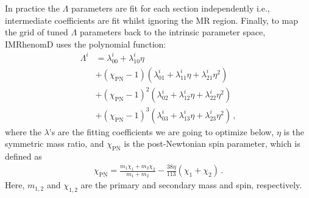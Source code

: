 \documentclass[twocolumn]{aastex631}
\begin{document}
In practice the $\Lambda$ parameters are fit for each section independently i.e., intermediate coefficients are fit whilst ignoring the MR region.
Finally, to map the grid of tuned $\Lambda$ parameters back to the intrinsic parameter space, IMRhenomD uses the polynomial function:
\begin{align} \label{eq:Lambda}
	\Lambda^i&=\lambda_{00}^i+\lambda_{10}^i\eta \nonumber \\
	&+(\chi_{\mathrm{PN}}-1)(\lambda_{01}^i+\lambda_{11}^i\eta+\lambda_{21}^i\eta^2) \nonumber \\ 
	&+(\chi_{\mathrm{PN}}-1)^2(\lambda_{02}^i+\lambda_{12}^i\eta+\lambda_{22}^i\eta^2) \nonumber \\
	&+(\chi_{\mathrm{PN}}-1)^3(\lambda_{03}^i+\lambda_{13}^i\eta+\lambda_{23}^i\eta^2)\,,
\end{align}
where the $\lambda$'s are the fitting coefficients we are going to optimize below, $\eta$ is
the symmetric mass ratio, and $\chi_{\mathrm{PN}}$ is the post-Newtonian spin
parameter, which is defined as 
\begin{align}
	\chi_{\mathrm{PN}}=\frac{m_1\chi_1+m_2\chi_2}{m_1+m_2}-\frac{38\eta}{113}(\chi_1+\chi_2)\,.
\end{align}
Here, $m_{1,2}$ and $\chi_{1,2}$ are the primary and secondary mass and spin,
respectively. 



\end{document}
